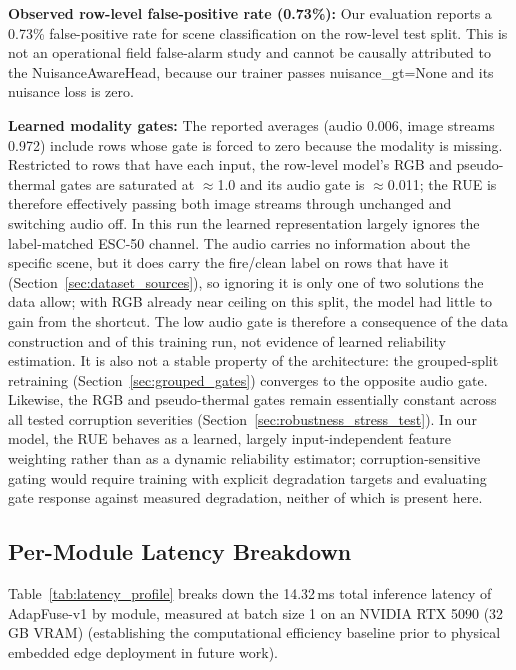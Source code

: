 \textbf{Observed row-level false-positive rate (0.73\%):}
Our evaluation reports a 0.73\% false-positive rate for scene classification on the row-level test split. This is not an operational field false-alarm study and cannot be causally attributed to the NuisanceAwareHead, because our trainer passes nuisance\_gt=None and its nuisance loss is zero.

\textbf{Learned modality gates:}
The reported averages (audio 0.006, image streams 0.972) include rows whose gate is forced to zero because the modality is missing. Restricted to rows that have each input, the row-level model's RGB and pseudo-thermal gates are saturated at $\approx$1.0 and its audio gate is $\approx$0.011; the RUE is therefore effectively passing both image streams through unchanged and switching audio off. In this run the learned representation largely ignores the label-matched ESC-50 channel. The audio carries no information about the specific scene, but it does carry the fire/clean label on rows that have it (Section~\ref{sec:dataset_sources}), so ignoring it is only one of two solutions the data allow; with RGB already near ceiling on this split, the model had little to gain from the shortcut. The low audio gate is therefore a consequence of the data construction and of this training run, not evidence of learned reliability estimation. It is also not a stable property of the architecture: the grouped-split retraining (Section~\ref{sec:grouped_gates}) converges to the opposite audio gate. Likewise, the RGB and pseudo-thermal gates remain essentially constant across all tested corruption severities (Section~\ref{sec:robustness_stress_test}). In our model, the RUE behaves as a learned, largely input-independent feature weighting rather than as a dynamic reliability estimator; corruption-sensitive gating would require training with explicit degradation targets and evaluating gate response against measured degradation, neither of which is present here.

\subsection{Per-Module Latency Breakdown}

Table~\ref{tab:latency_profile} breaks down the 14.32\,ms total inference latency of AdapFuse-v1 by module, measured at batch size 1 on an NVIDIA RTX 5090 (32\,GB VRAM) (establishing the computational efficiency baseline prior to physical embedded edge deployment in future work).

